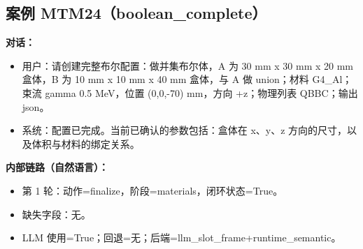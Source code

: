 \documentclass[11pt]{ctexart}
\begin{document}
\subsection{案例 MTM24（boolean\_complete）}
\textbf{对话：}
\begin{itemize}
\item 用户：请创建完整布尔配置：做并集布尔体，A 为 30 mm x 30 mm x 20 mm 盒体，B 为 10 mm x 10 mm x 40 mm 盒体，与 A 做 union；材料 G4\_Al；束流 gamma 0.5 MeV，位置 (0,0,-70) mm，方向 +z；物理列表 QBBC；输出 json。
\item 系统：配置已完成。当前已确认的参数包括：盒体在 x、y、z 方向的尺寸，以及体积与材料的绑定关系。
\end{itemize}
\textbf{内部链路（自然语言）：}
\begin{itemize}
\item 第 1 轮：动作=finalize，阶段=materials，闭环状态=True。
\item 缺失字段：无。
\item LLM 使用=True；回退=无；后端=llm\_slot\_frame+runtime\_semantic。
\end{itemize}
\end{document}
